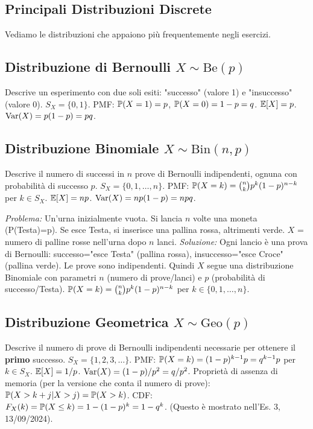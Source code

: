 \documentclass[12pt,a4paper]{article}
\begin{document}
\begin{example}
\section{Principali Distribuzioni Discrete}
Vediamo le distribuzioni che appaiono più frequentemente negli esercizi.

\subsection{Distribuzione di Bernoulli \texorpdfstring{$X \sim \text{Be}(p)$}{X ~ Be(p)}}
Descrive un esperimento con due soli esiti: "successo" (valore 1) e "insuccesso" (valore 0).
$S_X = \{0, 1\}$.
PMF: $\mathbb{P}(X=1) = p$, $\mathbb{P}(X=0) = 1-p = q$.
$\mathbb{E}[X] = p$.
$\mathrm{Var}(X) = p(1-p) = pq$.

\subsection{Distribuzione Binomiale \texorpdfstring{$X \sim \text{Bin}(n,p)$}{X ~ Bin(n,p)}}
Descrive il numero di successi in $n$ prove di Bernoulli indipendenti, ognuna con probabilità di successo $p$.
$S_X = \{0, 1, \dots, n\}$.
PMF: $\mathbb{P}(X=k) = \binom{n}{k} p^k (1-p)^{n-k}$ per $k \in S_X$.
$\mathbb{E}[X] = np$.
$\mathrm{Var}(X) = np(1-p) = npq$.
\begin{example}
\textit{Problema:} Un'urna inizialmente vuota. Si lancia $n$ volte una moneta (P(Testa)=p). Se esce Testa, si inserisce una pallina rossa, altrimenti verde. $X$ = numero di palline rosse nell'urna dopo $n$ lanci.
\textit{Soluzione:} Ogni lancio è una prova di Bernoulli: successo="esce Testa" (pallina rossa), insuccesso="esce Croce" (pallina verde). Le prove sono indipendenti.
Quindi $X$ segue una distribuzione Binomiale con parametri $n$ (numero di prove/lanci) e $p$ (probabilità di successo/Testa).
$\mathbb{P}(X=k) = \binom{n}{k} p^k (1-p)^{n-k}$ per $k \in \{0, 1, \dots, n\}$.
\end{example}

\subsection{Distribuzione Geometrica \texorpdfstring{$X \sim \text{Geo}(p)$}{X ~ Geo(p)}}
Descrive il numero di prove di Bernoulli indipendenti necessarie per ottenere il \textbf{primo} successo.
$S_X = \{1, 2, 3, \dots\}$.
PMF: $\mathbb{P}(X=k) = (1-p)^{k-1} p = q^{k-1}p$ per $k \in S_X$.
$\mathbb{E}[X] = 1/p$.
$\mathrm{Var}(X) = (1-p)/p^2 = q/p^2$.
Proprietà di assenza di memoria (per la versione che conta il numero di prove):
$\mathbb{P}(X > k+j | X > j) = \mathbb{P}(X > k)$.
CDF: $F_X(k) = \mathbb{P}(X \le k) = 1 - (1-p)^k = 1 - q^k$. (Questo è mostrato nell'Es. 3, 13/09/2024).


\end{example}
\end{document}
